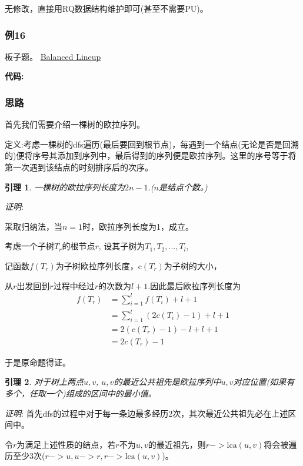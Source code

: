 \documentclass{article}
\newtheorem{lemma}{引理}
\newcommand{\lca}{\text{lca}}
\newcommand{\inputcppfile}[1]{}
\begin{document}
无修改，直接用RQ数据结构维护即可(甚至不需要PU)。

\subsubsection{例16}
板子题。
\href{http://poj.org/problem?id=3264}{Balanced Lineup}

\textbf{代码:}
\inputcppfile{Code_16.cpp}
  
\subsubsection{思路}
首先我们需要介绍一棵树的欧拉序列。

定义:考虑一棵树的dfs遍历(最后要回到根节点)，每遇到一个结点(无论是否是回溯的)便将序号其添加到序列中，最后得到的序列便是欧拉序列。这里的序号等于将第一次遇到该结点的时刻排序后的次序。


\begin{lemma}
    一棵树的欧拉序列长度为$2n-1$.($n$是结点个数。)
\end{lemma}

\emph{证明}:

采取归纳法，当$n = 1$时，欧拉序列长度为1，成立。

考虑一个子树$T_r$的根节点$r$, 设其子树为$T_1,T_2,...,T_l$, 

记函数$f(T_r)$为子树欧拉序列长度，$\text{c}(T_r)$为子树的大小，

从$r$出发回到$r$过程中经过$r$的次数为$l+1$.因此最后欧拉序列长度为
\begin{align*}
    f(T_r) & = \displaystyle \sum_{i = 1}^{l} f(T_i) + l + 1 \\
    &= \displaystyle \sum_{i = 1}^{l} (2c(T_i)-1) + l + 1\\
    &= 2(c(T_r)-1) - l + l + 1  \\
    &= 2c(T_r) - 1
\end{align*}

于是原命题得证。

\begin{lemma}
    对于树上两点$u,v$, $u,v$的最近公共祖先是欧拉序列中$u,v$对应位置(如果有多个，任取一个)组成的区间中的最小值。
\end{lemma}

\emph{证明}:
首先dfs的过程中对于每一条边最多经历2次，其次最近公共祖先必在上述区间中。

令$r$为满足上述性质的结点，若$r$不为$u,v$的最近祖先，则$r->\lca(u,v)$将会被遍历至少3次($r->u, u->r,r->\lca(u,v)$)。
\end{document}
